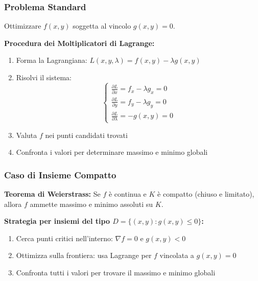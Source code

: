 \subsubsection{Problema Standard}
Ottimizzare $f(x,y)$ soggetta al vincolo $g(x,y) = 0$.

\begin{strategia}
\textbf{Procedura dei Moltiplicatori di Lagrange:}
\begin{enumerate}
    \item Forma la Lagrangiana: $L(x,y,\lambda) = f(x,y) - \lambda g(x,y)$
    \item Risolvi il sistema:
    \[ \begin{cases} 
    \frac{\partial L}{\partial x} = f_x - \lambda g_x = 0 \\
    \frac{\partial L}{\partial y} = f_y - \lambda g_y = 0 \\
    \frac{\partial L}{\partial \lambda} = -g(x,y) = 0
    \end{cases} \]
    \item Valuta $f$ nei punti candidati trovati
    \item Confronta i valori per determinare massimo e minimo globali
\end{enumerate}
\end{strategia}

\subsubsection{Caso di Insieme Compatto}

\begin{info}
\textbf{Teorema di Weierstrass:} Se $f$ è continua e $K$ è compatto (chiuso e limitato), allora $f$ ammette massimo e minimo assoluti su $K$.

\textbf{Strategia per insiemi del tipo $D = \{(x,y) : g(x,y) \leq 0\}$:}
\begin{enumerate}
    \item Cerca punti critici nell'interno: $\nabla f = 0$ e $g(x,y) < 0$
    \item Ottimizza sulla frontiera: usa Lagrange per $f$ vincolata a $g(x,y) = 0$
    \item Confronta tutti i valori per trovare il massimo e minimo globali
\end{enumerate}
\end{info}

